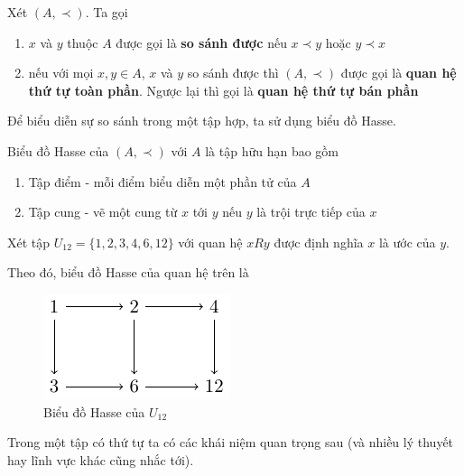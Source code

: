 \begin{definition}
    Xét $(A, \prec)$. Ta gọi
    \begin{enumerate}
        \item $x$ và $y$ thuộc $A$ được gọi là \textbf{so sánh được} nếu
        $x \prec y$ hoặc $y \prec x$
        \item nếu với mọi $x, y \in A$, $x$ và $y$ so sánh được thì $(A, \prec)$
        được gọi là \textbf{quan hệ thứ tự toàn phần}. Ngược lại thì gọi là
        \textbf{quan hệ thứ tự bán phần}
    \end{enumerate}
\end{definition}

Để biểu diễn sự so sánh trong một tập hợp, ta sử dụng biểu đồ Hasse.

\begin{definition}
    Biểu đồ Hasse của $(A, \prec)$ với $A$ là tập hữu hạn bao gồm
    \begin{enumerate}
        \item Tập điểm - mỗi điểm biểu diễn một phần tử của $A$
        \item Tập cung - vẽ một cung từ $x$ tới $y$ nếu $y$ là trội trực tiếp
        của $x$
    \end{enumerate}
\end{definition}

\begin{example}
    Xét tập $U_{12} = \{ 1, 2, 3, 4, 6, 12 \}$ với quan hệ $x R y$ được định
    nghĩa $x$ là ước của $y$.

    Theo đó, biểu đồ Hasse của quan hệ trên là
    \begin{figure}[ht]
        \centering
        \includegraphics{../pics/hasse/hasse1.pdf}
        \caption{Biểu đồ Hasse của $U_{12}$}
    \end{figure}
\end{example}

Trong một tập có thứ tự ta có các khái niệm quan trọng sau (và nhiều
lý thuyết hay lĩnh vực khác cũng nhắc tới).

